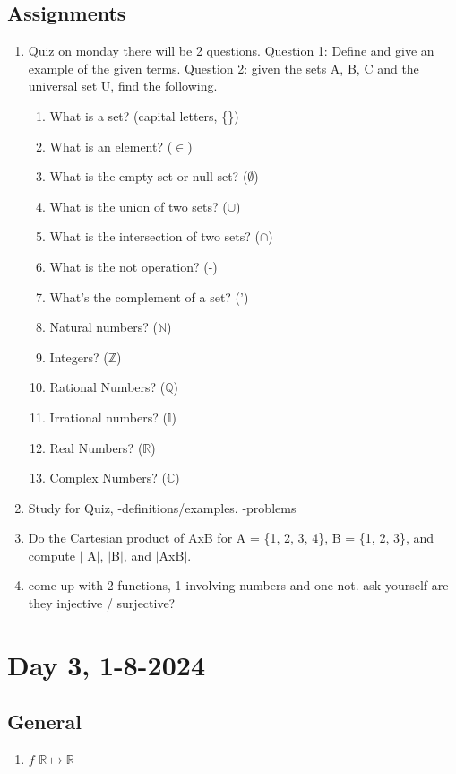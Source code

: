 \documentclass[12pt]{article}
\begin{document}
\subsection{Assignments}
\begin{enumerate}
    \item Quiz on monday there will be 2 questions. Question 1: Define and give an example of the given terms. Question 2:  given the sets A, B, C and the universal set U, find the following.
    \begin{enumerate}
        \item What is a set? (capital letters, \{\})
        \item What is an element? (\(\in\))
        \item What is the empty set or null set? (\(\emptyset\))
        \item What is the union of two sets? (\(\cup\))
        \item What is the intersection of two sets? (\(\cap\))
        \item What is the not operation? (-)
        \item What's the complement of a set? (')
        \item Natural numbers? ($\mathbb{N}$)
        \item Integers? ($\mathbb{Z}$)
        \item Rational Numbers? ($\mathbb{Q}$)
        \item Irrational numbers? ($\mathbb{I}$)
        \item Real Numbers? ($\mathbb{R}$)
        \item Complex Numbers? ($\mathbb{C}$)
    \end{enumerate}
    \item Study for Quiz, -definitions/examples. -problems
    \item Do the Cartesian product of AxB for A = \{1, 2, 3, 4\}, B = \{1, 2, 3\}, and compute \(\vert\) A\(\vert\), \(\vert\)B\(\vert\), and \(\vert\)AxB\(\vert\).
    \item come up with 2 functions, 1 involving numbers and one not. ask yourself are they injective / surjective?
\end{enumerate}
\section{Day 3, 1-8-2024}
\subsection{General}
\begin{enumerate}
    \item \(f\) $\mathbb{R}$\(\mapsto\)$\mathbb{R}$
\end{enumerate}
\end{document}
